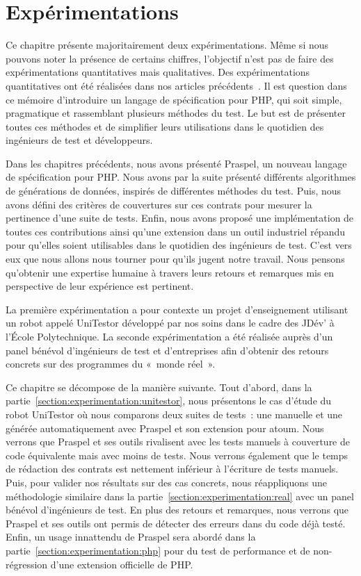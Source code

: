 \chapter{Expérimentations}
\label{chapter:experimentations}

\minitoc

Ce chapitre présente majoritairement deux expérimentations. Même si nous pouvons
noter la présence de certains chiffres, l'objectif n'est pas de faire des
expérimentations {\strong quantitatives} mais {\strong qualitatives}. Des
expérimentations quantitatives ont été réalisées dans nos articles
précédents~. Il est question
dans ce mémoire d'introduire un langage de spécification pour PHP, qui soit
simple, pragmatique et rassemblant plusieurs méthodes du test. Le but est de
présenter toutes ces méthodes et de simplifier leurs utilisations dans le
quotidien des ingénieurs de test et développeurs.

Dans les chapitres précédents, nous avons présenté Praspel, un nouveau langage
de spécification pour PHP. Nous avons par la suite présenté différents
algorithmes de générations de données, inspirés de différentes méthodes du test.
Puis, nous avons défini des critères de couvertures sur ces contrats pour
mesurer la pertinence d'une suite de tests. Enfin, nous avons proposé une
implémentation de toutes ces contributions ainsi qu'une extension dans un outil
industriel répandu pour qu'elles soient utilisables dans le quotidien des
ingénieurs de test. C'est vers eux que nous allons nous tourner pour qu'ils
jugent notre travail. Nous pensons qu'obtenir une expertise humaine à travers
leurs retours et remarques mis en perspective de leur expérience est pertinent.

La première expérimentation a pour contexte un projet d'enseignement utilisant
un robot appelé UniTestor développé par nos soins dans le cadre des JDév' à
l'École Polytechnique. La seconde expérimentation a été réalisée auprès d'un
panel bénévol d'ingénieurs de test et d'entreprises afin d'obtenir des retours
concrets sur des programmes du «~monde réel~».

Ce chapitre se décompose de la manière suivante. Tout d'abord, dans la
partie~\ref{section:experimentation:unitestor}, nous présentons le cas d'étude
du robot UniTestor où nous comparons deux suites de tests~: une manuelle et une
générée automatiquement avec Praspel et son extension pour atoum. Nous verrons
que Praspel et ses outils rivalisent avec les tests manuels à couverture de code
équivalente mais avec moins de tests. Nous verrons également que le temps de
rédaction des contrats est nettement inférieur à l'écriture de tests manuels.
Puis, pour valider nos résultats sur des cas concrets, nous réappliquons une
méthodologie similaire dans la partie~\ref{section:experimentation:real} avec un
panel bénévol d'ingénieurs de test. En plus des retours et remarques, nous
verrons que Praspel et ses outils ont permis de détecter des erreurs dans du
code déjà testé. Enfin, un usage innattendu de Praspel sera abordé dans la
partie~\ref{section:experimentation:php} pour du test de performance et de
non-régression d'une extension officielle de PHP.

